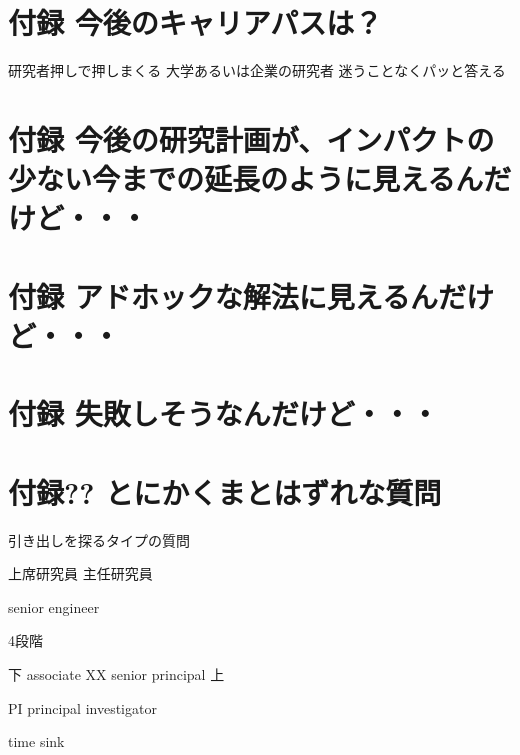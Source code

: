 \section{付録 今後のキャリアパスは？}
\label{sec-25}

研究者押しで押しまくる
大学あるいは企業の研究者
迷うことなくパッと答える

\section{付録 今後の研究計画が、インパクトの少ない今までの延長のように見えるんだけど・・・}
\label{sec-26}


\section{付録 アドホックな解法に見えるんだけど・・・}
\label{sec-27}


\section{付録 失敗しそうなんだけど・・・}
\label{sec-28}


\section{付録?? とにかくまとはずれな質問}
\label{sec-29}

引き出しを探るタイプの質問



上席研究員
主任研究員

senior engineer

4段階

下
associate
XX
senior
principal
上

PI principal investigator

time sink
